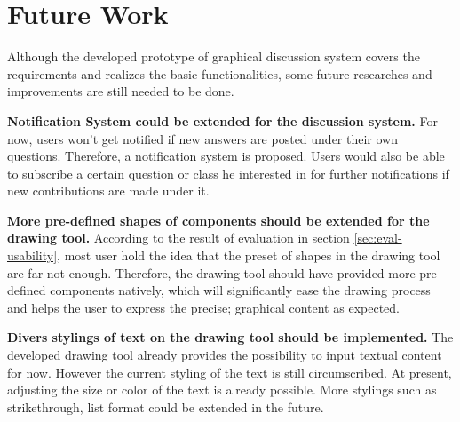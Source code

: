 \section{Future Work}

Although the developed prototype of graphical discussion system covers the requirements and realizes the basic functionalities, some future researches and improvements are still needed to be done.

\textbf{Notification System could be extended for the discussion system.} For now, users won't get notified if new answers are posted under their own questions. Therefore, a notification system is proposed. Users would also be able to subscribe a certain question or class he interested in for further notifications if new contributions are made under it.

\textbf{More pre-defined shapes of components should be extended for the drawing tool.} According to the result of evaluation in section \ref{sec:eval-usability}, most user hold the idea that the preset of shapes in the drawing tool are far not enough. Therefore, the drawing tool should have provided more pre-defined components natively, which will significantly ease the drawing process and helps the user to express the precise; graphical content as expected. 

\textbf{Divers stylings of text on the drawing tool should be implemented.} The developed drawing tool already provides the possibility to input textual content for now. However the current styling of the text is still circumscribed. At present, adjusting the size or color of the text is already possible. More stylings such as strikethrough, list format could be extended in the future. 